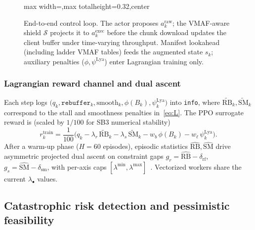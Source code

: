 \documentclass[preprint,12pt,times]{elsarticle}
\begin{document}
\begin{figure}[htbp]
    \centering
    \begin{adjustbox}{max width=\linewidth,max totalheight=0.32\textheight,center}
    
    \end{adjustbox}
    \caption{End-to-end control loop. The actor proposes \(a^{\mathrm{raw}}_k\); the VMAF-aware shield \(\mathcal{S}\) projects it to \(a^{\mathrm{exec}}_k\) before the chunk download updates the client buffer under time-varying throughput. Manifest lookahead (including ladder VMAF tables) feeds the augmented state \(s_k\); auxiliary penalties (\(\phi,\psi^{\mathrm{Lya}}\)) enter Lagrangian training only.}
    \label{fig:arch}
\end{figure}

\subsubsection{Lagrangian reward channel and dual ascent}\label{sec:method:lag}

Each step logs \(\big(q_k,\texttt{rebuffer}_k,\mathrm{smooth}_k,\phi(B_k),\psi^{\mathrm{Lya}}_k\big)\) into \texttt{info}, where \(\widetilde{\mathrm{RB}}_k,\widetilde{\mathrm{SM}}_k\) correspond to the stall and smoothness penalties in~\eqref{eq:L}.
The PPO surrogate reward is (scaled by \(1/100\) for SB3 numerical stability)
\begin{equation}
\label{eq:rtrain}
    r^{\mathrm{train}}_k
    = \frac{1}{100}\Big(
        q_k
        - \lambda_r \,\widetilde{\mathrm{RB}}_k
        - \lambda_s \,\widetilde{\mathrm{SM}}_k
        - w_b\,\phi(B_k)
        - w_\ell\,\psi^{\mathrm{Lya}}_k
    \Big).
\end{equation}
After a warm-up phase (\(H{=}60\) episodes), episodic statistics \(\hat{\mathrm{RB}},\hat{\mathrm{SM}}\) drive asymmetric projected dual ascent on constraint gaps \(g_r=\hat{\mathrm{RB}}-\delta_{\mathrm{rf}}\), \(g_s=\hat{\mathrm{SM}}-\delta_{\mathrm{sm}}\), with per-axis caps \([\lambda^{\min},\lambda^{\max}]\)~\cite{paternain2019dual,tian2022towards}.
Vectorized workers share the current \(\lambda_{\bullet}\) values.

\subsection{Catastrophic risk detection and pessimistic feasibility}\label{sec:method:risk}
\end{document}
